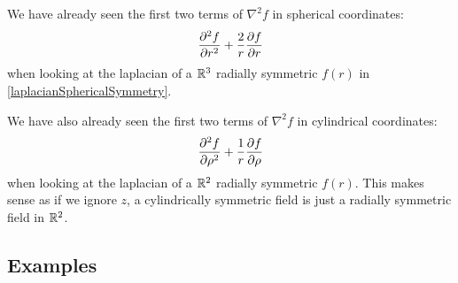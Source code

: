 \documentclass[../main.tex]{subfiles}
\begin{document}
\begin{remark}[Note]
  We have already seen the first two terms of $\nabla^2 f$ in spherical coordinates:
  \[
    \pderiv[2]{f}{r} + \frac{2}{r}\pderiv{f}{r}
  \]
  when looking at the laplacian of a $\mathbb{R}^3$ radially symmetric $f(r)$ in \cref{laplacianSphericalSymmetry}.

  We have also already seen the first two terms of $\nabla^2 f$ in cylindrical coordinates:
  \[
    \pderiv[2]{f}{\rho} + \frac{1}{r}\pderiv{f}{\rho}
  \]
  when looking at the laplacian of a $\mathbb{R}^2$ radially symmetric $f(r)$.
  This makes sense as if we ignore $z$, a cylindrically symmetric field is just a radially symmetric field in $\mathbb{R}^2$.
\end{remark}
\subsection{Examples}
\end{document}
